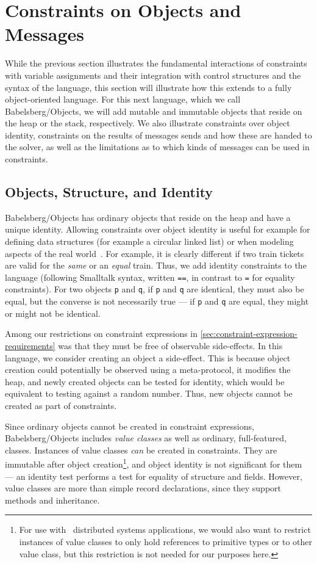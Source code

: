 \section{Constraints on Objects and Messages}
\label{sec:complex-objects}

While the previous section illustrates the fundamental interactions of
constraints with variable assignments and their integration with
control structures and the syntax of the language, this section will
illustrate how this extends to a fully object-oriented language. For
this next language, which we call Babelsberg/Objects, we will add
mutable and immutable objects that reside on the heap or the stack,
respectively. We also illustrate constraints over object identity,
constraints on the results of messages sends and how these are handed
to the solver, as well as the limitations as to which kinds of
messages can be used in constraints.

\subsection{Objects, Structure, and Identity}

Babelsberg/Objects has ordinary objects that reside on the heap and have
a unique identity. Allowing constraints over object identity is useful
for example for defining data structures (for example a circular
linked list) or when modeling aspects of the real world~\cite{lopez-ecoop-1994}. For example, it is clearly different if two
train tickets are valid for the \emph{same} or an \emph{equal} train.
Thus, we add identity constraints to the language (following Smalltalk
syntax, written \verb|==|, in contrast to \verb|=| for equality
constraints).  For two objects \verb|p| and \verb|q|, if \verb|p| and
\verb|q| are identical, they must also be equal, but the converse is
not necessarily true --- if \verb|p| and \verb|q| are equal, they
might or might not be identical.

Among our restrictions on constraint expressions in
\autoref{sec:constraint-expression-requirements} was that they must be
free of observable side-effects. In this language, we consider
creating an object a side-effect. This is because object creation
could potentially be observed using a meta-protocol, it modifies the
heap, and newly created objects can be tested for identity, which
would be equivalent to testing against a random number. Thus, new
objects cannot be created as part of constraints.

Since ordinary objects cannot be created in constraint expressions,
Babelsberg/Objects includes \emph{value classes} as well as ordinary,
full-featured, classes. Instances of value classes \emph{can} be
created in constraints. They are immutable after object
creation\footnote{For use with \eg\ distributed systems applications,
  we would also want to restrict instances of value classes to only
  hold references to primitive types or to other value class, but this
  restriction is not needed for our purposes here.}, and object
identity is not significant for them --- an identity test performs a
test for equality of structure and fields.  However, value classes are
more than simple record declarations, since they support methods and
inheritance.


